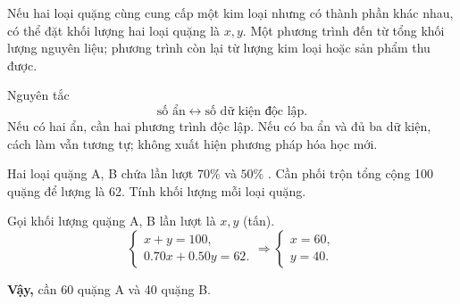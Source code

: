 Nếu hai loại quặng cùng cung cấp một kim loại nhưng có thành phần khác nhau, có thể đặt khối lượng hai loại quặng là $x,y$. Một phương trình đến từ tổng khối lượng nguyên liệu; phương trình còn lại từ lượng kim loại hoặc sản phẩm thu được.

\begin{ghinho}{Nguyên tắc}
\[
\text{số ẩn} \leftrightarrow \text{số dữ kiện độc lập}.
\]
Nếu có hai ẩn, cần hai phương trình độc lập. Nếu có ba ẩn và đủ ba dữ kiện, cách làm vẫn tương tự; không xuất hiện phương pháp hóa học mới.
\end{ghinho}

\begin{tuluyen}
Hai loại quặng A, B chứa lần lượt $70\%$ và $50\%$ . Cần phối trộn tổng cộng \SI{100}{\ton} quặng để lượng  là \SI{62}{\ton}. Tính khối lượng mỗi loại quặng.
\begin{loigiaiBT}
Gọi khối lượng quặng A, B lần lượt là $x,y$ (tấn).
\[
\begin{cases}
x+y=100,\\
0.70x+0.50y=62.
\end{cases}
\Rightarrow
\begin{cases}
x=60,\\
y=40.
\end{cases}
\]

\textbf{Vậy,} cần \SI{60}{\ton} quặng A và \SI{40}{\ton} quặng B.
\end{loigiaiBT}
\end{tuluyen}
